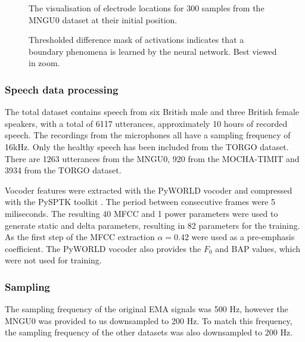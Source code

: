 \documentclass[a4paper]{article}
\begin{document}
\begin{figure}[t]
  \caption{The visualisation of electrode locations for 300 samples from
    the MNGU0 dataset at their initial position.}
  \label{fig:electrodes}
  \begin{center}
    \scalebox{0.50}{}
\end{center}
\end{figure}

\begin{figure}[t]
  \caption{Thresholded difference mask of activations indicates that a boundary phenomena is learned by the neural network. Best viewed in zoom.}
  \label{fig:mask}
  \begin{center}
    \scalebox{0.40}{}
\end{center}
\end{figure}
\subsubsection{Speech data processing}


The total dataset contains speech from six British male and three British
female speakers, with a total of 6117 utterances, approximately 10 hours of recorded
speech. The recordings from the microphones all have a sampling frequency of 16kHz.
Only the healthy speech has been included from the TORGO dataset. There are 1263 utterances from the
MNGU0, 920 from the MOCHA-TIMIT and 3934 from the TORGO dataset.

Vocoder features were extracted with the PyWORLD vocoder \cite{Morise2016}
and compressed with the PySPTK toolkit \cite{pysptk}. The period between consecutive
frames were 5 miliseconds. The resulting 40 MFCC and 1 power parameters
were used to generate static and delta parameters, resulting in 82
parameters for the training. As the first step of the MFCC extraction \( \alpha
= 0.42 \) were used as a pre-emphasis coefficient. The PyWORLD vocoder
also provides the $ F_0 $ and BAP values, which were not used for training.

\subsubsection{Sampling}

The sampling frequency of the original EMA signals was 500 Hz, however
the MNGU0 was provided to us downsampled to 200 Hz. To match this frequency,
the sampling frequency of the other datasets was also downsampled to 200 Hz.
\end{document}
